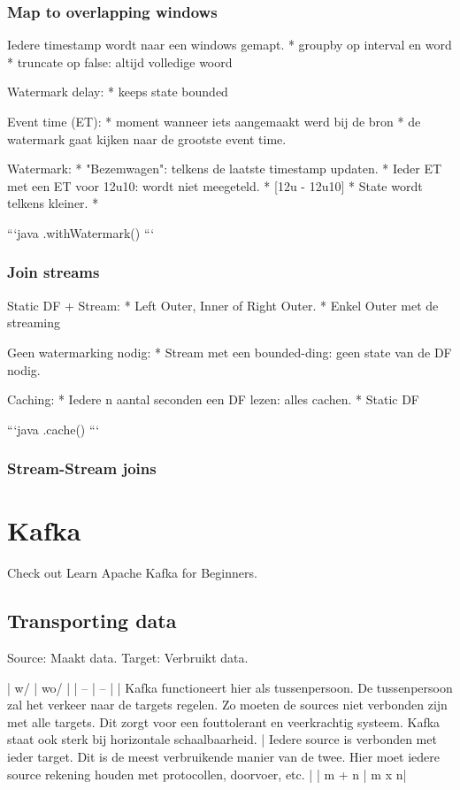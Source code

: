 \documentclass[a4paper,10pt,twoside]{report}
\begin{document}
\subsection{Map to overlapping windows}

Iedere timestamp wordt naar een windows gemapt.
* groupby op interval en word
* truncate op false: altijd volledige woord


Watermark delay:
* keeps state bounded


Event time (ET): 
* moment wanneer iets aangemaakt werd bij de bron
* de watermark gaat kijken naar de grootste event time.

Watermark:
* "Bezemwagen": telkens de laatste timestamp updaten.
* Ieder ET met een ET voor 12u10: wordt niet meegeteld.
* [12u - 12u10]
* State wordt telkens kleiner.
* 

```java
.withWatermark()
```

\subsection{Join streams}

Static DF + Stream:
* Left Outer, Inner of Right Outer.
* Enkel Outer met de streaming

Geen watermarking nodig:
* Stream met een bounded-ding: geen state van de DF nodig.

Caching:
* Iedere n aantal seconden een DF lezen: alles cachen.
* Static DF

```java
.cache()
```

\subsection{Stream-Stream joins}


\chapter{Kafka}

Check out Learn Apache Kafka for Beginners.

\section{Transporting data}

Source: Maakt data.
Target: Verbruikt data.

| w/ | wo/ |
| -- | -- |
|  Kafka functioneert hier als tussenpersoon. De tussenpersoon zal het verkeer naar de targets regelen. Zo moeten de sources niet verbonden zijn met alle targets. Dit zorgt voor een fouttolerant en veerkrachtig systeem. Kafka staat ook sterk bij horizontale schaalbaarheid. | Iedere source is verbonden met ieder target. Dit is de meest verbruikende manier van de twee. Hier moet iedere source rekening houden met protocollen, doorvoer, etc. |
| m + n | m x n|
\end{document}
